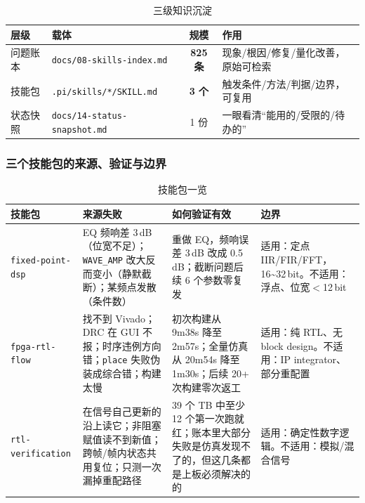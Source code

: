 \documentclass[withoutpreface,bwprint]{cumcmthesis}
\begin{document}
\begin{table}[H]
\centering
\caption{三级知识沉淀}
\label{tab:levels}
\begin{tabular}{p{1.5cm}p{4.6cm}cp{5.2cm}}
\toprule[1.5pt]
\rowcolor{gray!25} 层级 & 载体 & 规模 & 作用 \\
\midrule[1pt]
问题账本 & \texttt{docs/08-skills-index.md} & \textbf{825 条} & 现象/根因/修复/量化改善，原始可检索 \\
技能包   & \texttt{.pi/skills/*/SKILL.md}   & \textbf{3 个} & 触发条件/方法/判据/边界，可复用 \\
状态快照 & \texttt{docs/14-status-snapshot.md} & 1 份 & 一眼看清“能用的/受限的/待办的” \\
\bottomrule[1.5pt]
\end{tabular}
\end{table}

\subsubsection{三个技能包的来源、验证与边界}

\begin{table}[H]
\centering
\caption{技能包一览}
\label{tab:skills}
\begin{tabular}{p{2.8cm}p{3.6cm}p{3.4cm}p{3.4cm}}
\toprule[1.5pt]
\rowcolor{gray!25} 技能包 & 来源失败 & 如何验证有效 & 边界 \\
\midrule[1pt]
\texttt{fixed-point-dsp} & EQ 频响差 3\,dB（位宽不足）；\texttt{WAVE\_AMP} 改大反而变小（静默截断）；某频点发散（条件数） & 重做 EQ，频响误差 3\,dB 改成 0.5\,dB；截断问题后续 6 个参数零复发 & 适用：定点 IIR/FIR/FFT，16\textasciitilde 32\,bit。不适用：浮点、位宽$<$12\,bit \\
\texttt{fpga-rtl-flow} & 找不到 Vivado；DRC 在 GUI 不报；时序违例方向错；\texttt{place} 失败伪装成综合错；构建太慢 & 初次构建从 9m38s  降至 2m57s；全量仿真从 20m54s 降至 1m30s；后续 20+ 次构建零次返工 & 适用：纯 RTL、无 block design。不适用：IP integrator、部分重配置 \\
\texttt{rtl-verification} & 在信号自己更新的沿上读它；非阻塞赋值读不到新值；跨帧/帧内状态共用复位；只测一次漏掉重配路径 & 39 个 TB 中至少 12 个第一次跑就红；账本里大部分失败是仿真发现不了的，但这几条都是上板必须解决的的 & 适用：确定性数字逻辑。不适用：模拟/混合信号 \\
\bottomrule[1.5pt]
\end{tabular}
\end{table}
\end{document}
